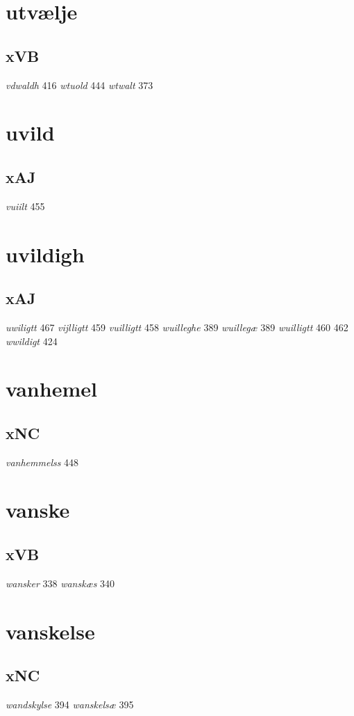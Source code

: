 \documentclass[a4paper,twocolumn]{article}
\begin{document}
\section{utvælje}
\label{sec:org3e9f890}
\subsection{xVB}
\label{sec:orgc79b71f}
\emph{vdwaldh} 416 \emph{wtuold} 444 \emph{wtwalt} 373 
\section{uvild}
\label{sec:org726e039}
\subsection{xAJ}
\label{sec:orgc827acb}
\emph{vuiilt} 455 
\section{uvildigh}
\label{sec:orge3045e4}
\subsection{xAJ}
\label{sec:orgf06cd8f}
\emph{uwiligtt} 467 \emph{vijlligtt} 459 \emph{vuilligtt} 458 \emph{wuilleghe} 389 \emph{wuillegæ} 389 \emph{wuilligtt} 460 462 \emph{wwildigt} 424 
\section{vanhemel}
\label{sec:org666f264}
\subsection{xNC}
\label{sec:org994a4d4}
\emph{vanhemmelss} 448 
\section{vanske}
\label{sec:org576ebd3}
\subsection{xVB}
\label{sec:orgd057bfc}
\emph{wansker} 338 \emph{wanskæs} 340 
\section{vanskelse}
\label{sec:org4578050}
\subsection{xNC}
\label{sec:org3f76c17}
\emph{wandskylse} 394 \emph{wanskelsæ} 395 
\end{document}
